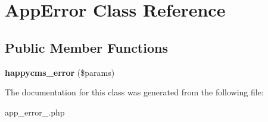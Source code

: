 \hypertarget{class_app_error}{
\section{\-App\-Error \-Class \-Reference}
\label{class_app_error}
}
\subsection*{\-Public \-Member \-Functions}
\begin{DoxyCompactItemize}
\item 
\hypertarget{class_app_error_ad13b6d21f0c8717f1b3d75e4822a8cad}{
{\bfseries happycms\-\_\-error} (\$params)}
\label{class_app_error_ad13b6d21f0c8717f1b3d75e4822a8cad}

\end{DoxyCompactItemize}


\-The documentation for this class was generated from the following file\-:\begin{DoxyCompactItemize}
\item 
app\-\_\-error\-\_\-.\-php\end{DoxyCompactItemize}
